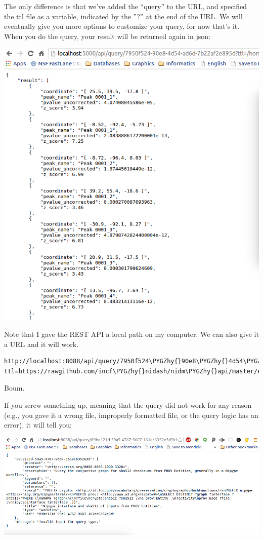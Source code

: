 \documentclass[letterpaper,10pt,english]{sphinxmanual}
\def\PYGZhy{\char`\-}
\begin{document}
The only difference is that we've added the ``query'' to the URL, and specified the ttl file as a variable, indicated by the ''?'' at the end of the URL. We will eventually give you more options to customize your query, for now that's it. When you do the query, your result will be returned again in json:

\includegraphics{doQuery.png}

Note that I gave the REST API a local path on my computer. We can also give it a URL and it will work.

\begin{Verbatim}[commandchars=\\\{\}]
http://localhost:8088/api/query/7950f524\PYGZhy{}90e8\PYGZhy{}4d54\PYGZhy{}ad6d\PYGZhy{}7b22af2e895d?ttl=https://rawgithub.com/incf\PYGZhy{}nidash/nidm\PYGZhy{}api/master/example/nidm.ttl
\end{Verbatim}

Boum.

If you screw something up, meaning that the query did not work for any reason (e.g., you gave it a wrong file, improperly formatted file, or the query logic has an error), it will tell you:

\includegraphics{screwUp.png}
\end{document}
